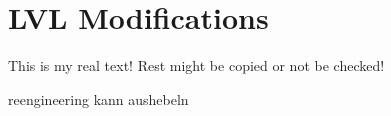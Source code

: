 \section{LVL Modifications} \label{section:evaluation-modifications}
This is my real text! Rest might be copied or not be checked!


reengineering kann aushebeln
